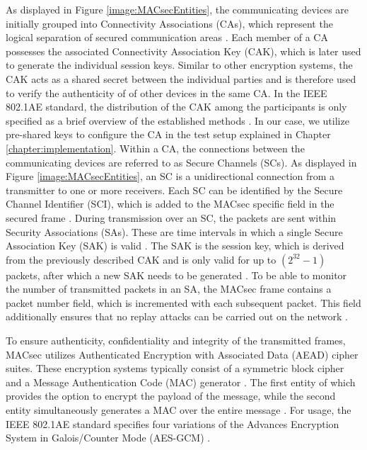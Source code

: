 \documentclass[conference, onecolumn, a4paper]{IEEEtran}
\begin{document}
\noindent As displayed in Figure \ref{image:MACsecEntities}, the communicating devices are initially grouped into Connectivity Associations (CAs), which 
represent the logical separation of secured communication areas \cite[p. 35]{IEEE-802-1AE:2018}. Each member of a CA possesses the associated Connectivity 
Association Key (CAK), which is later used to generate the individual session keys. Similar to other encryption systems, the CAK acts as a shared 
secret between the individual parties and is therefore used to verify the authenticity of of other devices in the same CA. In the IEEE 802.1AE standard, 
the distribution of the CAK among the participants is only specified as a brief overview of the established methods \cite[p. 230]{IEEE-802-1AE:2018}. 
In our case, we utilize pre-shared keys to configure the CA in the test setup explained in Chapter \ref{chapter:implementation}. Within a CA, the 
connections between the communicating devices are referred to as Secure Channels (SCs). As displayed in Figure \ref{image:MACsecEntities}, 
an SC is a unidirectional connection from a transmitter to one or more receivers. Each SC can be identified by the Secure Channel Identifier (SCI), 
which is added to the MACsec specific field in the secured frame \cite[p. 43]{IEEE-802-1AE:2018}. During transmission over an SC, the packets are sent 
within Security Associations (SAs). These are time intervals in which a single Secure Association Key (SAK) is valid \cite[p. 44]{IEEE-802-1AE:2018}. 
The SAK is the session key, which is derived from the previously described CAK and is only valid for up to ${(2^{32} -1)}$ packets, after which a new 
SAK needs to be generated \cite[p. 66]{IEEE-802-1AE:2018}. To be able to monitor the number of transmitted packets in an SA, the MACsec frame contains 
a packet number field, which is incremented with each subsequent packet. This field additionally ensures that no replay attacks can be carried out on 
the network \cite[p. 145]{IEEE-802-1AE:2018}. 

\smallskip
To ensure authenticity, confidentiality and integrity of the transmitted frames, MACsec utilizes Authenticated Encryption with Associated Data (AEAD) 
cipher suites. These encryption systems typically consist of a symmetric block cipher and a Message Authentication Code (MAC) generator 
\cite{NIST-AES_GCM:2007}. The first entity of which provides the option to encrypt the payload of the message, while the second entity simultaneously 
generates a MAC over the entire message \cite{GOOSE_confidentiality_integrity:2020}. For usage, the IEEE 802.1AE standard specifies four variations of 
the Advances Encryption System in Galois/Counter Mode (AES-GCM) \cite[p. 143ff]{IEEE-802-1AE:2018}.
\end{document}
